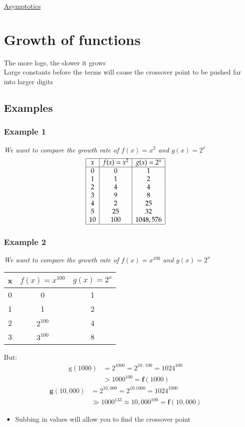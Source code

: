 \documentclass{article}[18pt]
\begin{document}
\begin{center}
\underline{\huge Asymptotics}
\end{center}
\section{Growth of functions}
The more logs, the slower it grows\\
Large constants before the terms will cause the crossover point to be pushed far into larger digits
\subsection{Examples}
\subsubsection{Example 1}
\textit{We want to compare the growth rate of $f(x)=x^2$ and $g(x)=2^x$}
$$\begin{array} { | c | c | c | c | } \hline x & { f ( x ) = x ^ { 2 } } & { g ( x ) = 2 ^ { x } } \\ \hline 0 & { 0 } & { 1 } \\ { 1 } & { 1 } & { 2 } \\ { 2 } & { 4 } & { 4 } \\ { 3 } & { 9 } & { 8 } \\ { 4 } & { 2 } & { 25 } \\ { 5 } & { 25 } & { 32 } \\ { 10 } & { 100 } & { 1048,576 } \\ \hline \end{array}$$
\subsubsection{Example 2}
\textit{We want to compare the growth rate of $f(x)=x^{100}$ and $g(x)=2^x$}
\begin{center}

\begin{tabular}{|c|c|c|}
	\hline 
	x & $f(x)=x^{100}$ & $g(x)=2^x$ \\ 
	\hline 
	0 & 0 & 1 \\ 
	\hline 
	1 & 1 & 2 \\ 
	\hline 
	2 & $2^{100}$ & 4 \\ 
	\hline 
	3 & $3^{100}$ & 8 \\ 
	\hline 
	\end{tabular} 
\end{center}
But:
$$\begin{aligned} \mathrm { g } ( 1000 ) & = 2 ^ { 1000 } = 2 ^ { 10 \cdot 100 } = 1024 ^ { 100 } \\ & > 1000 ^ { 100 } = \mathbf { f } ( 1000 ) \end{aligned}$$
$$\begin{aligned} \mathbf { g } ( 10,000 ) & = 2 ^ { 10,000 } = 2 ^ { 10.1000 } = 1024 ^ { 1000 } \\ & \gg 1000 ^ { 133 } \approx 10,000 ^ { 100 } = \mathbf { f } ( 10,000 ) \end{aligned}$$
\begin{itemize}
	\item Subbing in values will allow you to find the crossover point
\end{itemize}
\end{document}
